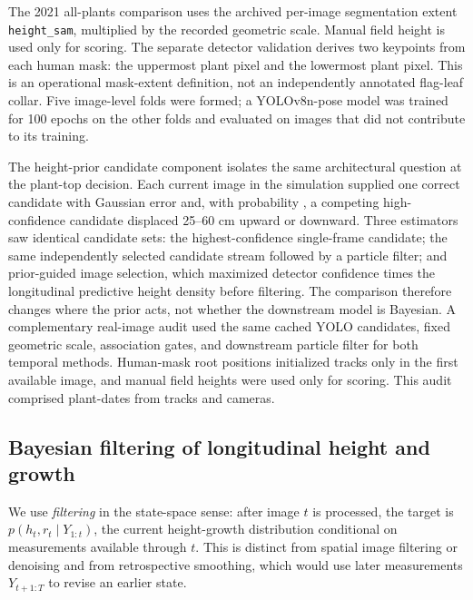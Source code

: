 \documentclass[12pt,letterpaper]{article}
\begin{document}
The 2021 all-plants comparison uses the archived per-image segmentation extent \texttt{height\_sam}, multiplied by the recorded geometric scale. Manual field height is used only for scoring. The separate detector validation derives two keypoints from each human mask: the uppermost plant pixel and the lowermost plant pixel. This is an operational mask-extent definition, not an independently annotated flag-leaf collar. Five image-level folds were formed; a YOLOv8n-pose model was trained for 100 epochs on the other folds and evaluated on images that did not contribute to its training.

The height-prior candidate component isolates the same architectural question at the plant-top decision. Each current image in the simulation supplied one correct candidate with Gaussian error and, with probability \PriorSpuriousProbability{}, a competing high-confidence candidate displaced 25--60 cm upward or downward. Three estimators saw identical candidate sets: the highest-confidence single-frame candidate; the same independently selected candidate stream followed by a particle filter; and prior-guided image selection, which maximized detector confidence times the longitudinal predictive height density before filtering. The comparison therefore changes where the prior acts, not whether the downstream model is Bayesian. A complementary real-image audit used the same cached YOLO candidates, fixed geometric scale, association gates, and downstream particle filter for both temporal methods. Human-mask root positions initialized tracks only in the first available image, and manual field heights were used only for scoring. This audit comprised \RealAuditN{} plant-dates from \RealAuditTracks{} tracks and \RealAuditCameras{} cameras.

\subsection{Bayesian filtering of longitudinal height and growth}

We use \emph{filtering} in the state-space sense: after image $t$ is processed, the target is $p(h_t,r_t\mid Y_{1:t})$, the current height-growth distribution conditional on measurements available through $t$. This is distinct from spatial image filtering or denoising and from retrospective smoothing, which would use later measurements $Y_{t+1:T}$ to revise an earlier state.
\end{document}
